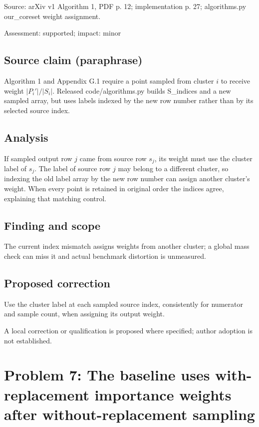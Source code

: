 \documentclass[11pt]{article}
\begin{document}
Source: arXiv v1 Algorithm 1, PDF p. 12; implementation p. 27; algorithms.py our\_coreset weight assignment.

Assessment: supported; impact: minor

\subsection*{Source claim (paraphrase)}

Algorithm 1 and Appendix G.1 require a point sampled from cluster \(i\) to receive weight \(|P_i'|/|S_i|\). Released code/algorithms.py builds S\_indices and a new sampled array, but uses labels indexed by the new row number rather than by its selected source index.

\subsection*{Analysis}

If sampled output row \(j\) came from source row \(s_j\), its weight must use the cluster label of \(s_j\). The label of source row \(j\) may belong to a different cluster, so indexing the old label array by the new row number can assign another cluster's weight. When every point is retained in original order the indices agree, explaining that matching control.

\subsection*{Finding and scope}

The current index mismatch assigns weights from another cluster; a global mass check can miss it and actual benchmark distortion is unmeasured.

\subsection*{Proposed correction}

Use the cluster label at each sampled source index, consistently for numerator and sample count, when assigning its output weight.

A local correction or qualification is proposed where specified; author adoption is not established.

\section*{Problem 7: The baseline uses with-replacement importance weights after without-replacement sampling}
\end{document}
